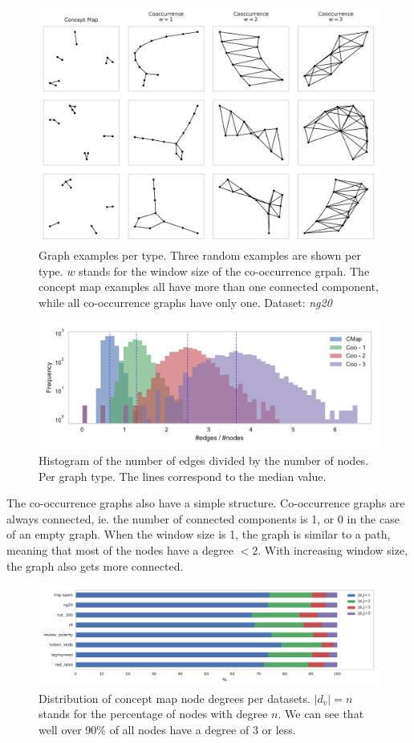\begin{figure}[htb!]
\centering
\includegraphics[width=0.7\linewidth]{assets/figures/examples_graphs.pdf}
\caption{Graph examples per type. Three random examples are shown per type. $w$ stands for the window size of the co-occurrence grpah. The concept map examples all have more than one connected component, while all co-occurrence graphs have only one. Dataset: \textit{ng20}}\label{fig:graph_examples}
\end{figure}

\begin{figure}[htb!]
\centering
\includegraphics[width=0.7\linewidth]{assets/figures/hist-edgesnodes.pdf}
\caption{Histogram of the number of edges divided by the number of nodes. Per graph type. The lines correspond to the median value.}
\label{fig:histogram-edges-div-nodes-per-type}
\end{figure}

The co-occurrence graphs also have a simple structure.
Co-occurrence graphs are always connected, ie. the number of connected components is 1, or 0 in the case of an empty graph.
When the window size is 1, the graph is similar to a path, meaning that most of the nodes have a degree $< 2$. With increasing window size, the graph also gets more connected.

\begin{figure}[htb!]
	\centering
	{\includegraphics[width=\linewidth]{assets/figures/percentage_degree.pdf}%
		\caption{%
			Distribution of concept map node degrees per datasets. $|d_v| = n$ stands for the percentage of nodes with degree $n$.
			We can see that well over 90\% of all nodes have a degree of $3$ or less.
		}%
		\label{fig:percentage_degree}}
\end{figure}

